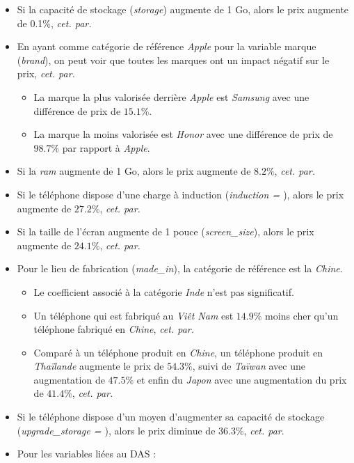 \documentclass[
  12pt,
]{report}
\providecommand{\tightlist}{%
  \setlength{\itemsep}{0pt}\setlength{\parskip}{0pt}}\usepackage{longtable,booktabs,array}
\renewcommand{\texttt}[1]{\colorbox{light}{\color{highlight}{\ttfamily{#1}}}}
\begin{document}
\begin{itemize}
\item
  Si la capacité de stockage (\emph{storage}) augmente de 1 Go, alors le
  prix augmente de 0.1\%, \emph{cet. par.}
\item
  En ayant comme catégorie de référence \emph{Apple} pour la variable
  marque (\emph{brand}), on peut voir que toutes les marques ont un
  impact négatif sur le prix, \emph{cet. par.}

  \begin{itemize}
  \tightlist
  \item
    La marque la plus valorisée derrière \emph{Apple} est \emph{Samsung}
    avec une différence de prix de \(15.1\%\).
  \item
    La marque la moins valorisée est \emph{Honor} avec une différence de
    prix de \(98.7\%\) par rapport à \emph{Apple}.
  \end{itemize}
\item
  Si la \emph{ram} augmente de 1 Go, alors le prix augmente de
  \(8.2\%\), \emph{cet. par.}
\item
  Si le téléphone dispose d'une charge à induction (\emph{induction =
  \texttt{TRUE}}), alors le prix augmente de \(27.2\%\), \emph{cet.
  par.}
\item
  Si la taille de l'écran augmente de 1 pouce (\emph{screen\_size}),
  alors le prix augmente de \(24.1\%\), \emph{cet. par.}
\item
  Pour le lieu de fabrication (\emph{made\_in}), la catégorie de
  référence est la \emph{Chine}.

  \begin{itemize}
  \tightlist
  \item
    Le coefficient associé à la catégorie \emph{Inde} n'est pas
    significatif.
  \item
    Un téléphone qui est fabriqué au \emph{Viêt Nam} est \(14.9\%\)
    moins cher qu'un téléphone fabriqué en \emph{Chine}, \emph{cet.
    par.}
  \item
    Comparé à un téléphone produit en \emph{Chine}, un téléphone produit
    en \emph{Thaïlande} augmente le prix de \(54.3\%\), suivi de
    \emph{Taïwan} avec une augmentation de \(47.5\%\) et enfin du
    \emph{Japon} avec une augmentation du prix de \(41.4\%\), \emph{cet.
    par.}
  \end{itemize}
\item
  Si le téléphone dispose d'un moyen d'augmenter sa capacité de stockage
  (\emph{upgrade\_storage = \texttt{TRUE}}), alors le prix diminue de
  \(36.3\%\), \emph{cet. par}.
\item
  Pour les variables liées au DAS :


\end{itemize}
\end{document}
